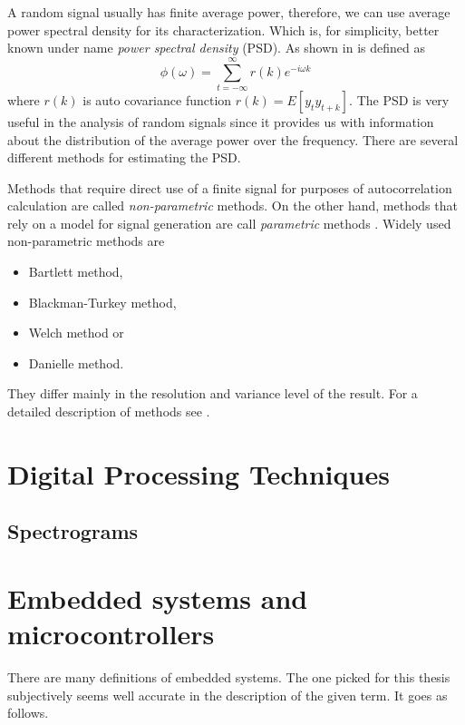 \documentclass[twoside]{ctuthesis}
\theoremstyle{plain}
\theoremstyle{definition}
\theoremstyle{note}
\begin{document}
A random signal usually has finite average power, therefore, we can use average power spectral density for its characterization. Which is, for simplicity, better known under name \textit{power spectral density} (PSD). As shown in \cite{cite:SAoS} is defined as
\begin{equation} \label{eq:PSD1}
\phi(\omega) = \sum_{t=-\infty}^{\infty}r(k)e^{-i\omega k}
\end{equation}
where $r(k)$ is auto covariance function $r(k) = E[y_{t}y_{t+k}]$.
The PSD is very useful in the analysis of random signals since it provides us with information about the distribution of the average power over the frequency. There are several different methods for estimating the PSD. 

Methods that require direct use of a finite signal for purposes of autocorrelation calculation are called \textit{non-parametric} methods. On the other hand, methods that rely on a model for signal generation are call \textit{parametric} methods \cite{cite:RT_DSP}. Widely used non-parametric methods are

\begin{itemize}
	\setlength{\itemsep}{5pt}
\item Bartlett method,
\item Blackman-Turkey method,
\item Welch method or
\item Danielle method.
\end{itemize}

They differ mainly in the resolution and variance level of the result. For a detailed description of methods see \cite{cite:2}.

\section{Digital Processing Techniques}

\subsection{Spectrograms}

\section{Embedded systems and microcontrollers}
There are many definitions of embedded systems. The one picked for this thesis subjectively seems well accurate in the description of the given term. It goes as follows.
\end{document}
